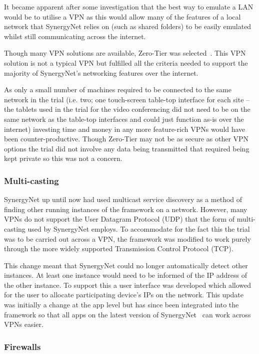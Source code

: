 \documentclass[a4paper,11pt]{article}
\begin{document}
It became apparent after some investigation that the best way to emulate a LAN would be to utilise a VPN as this would allow many of the features of a local network that SynergyNet relies on (such as shared folders) to be easily emulated whilst still communicating across the internet.

Though many VPN solutions are available, Zero-Tier was selected~\cite{zerotier:2016}.
This VPN solution is not a typical VPN but fulfilled all the criteria needed to support the majority of SynergyNet’s networking features over the internet.

As only a small number of machines required to be connected to the same network in the trial (i.e. two; one touch-screen table-top interface for each site – the tablets used in the trial for the video conferencing did not need to be on the same network as the table-top interfaces and could just function as-is over the internet) investing time and money in any more feature-rich VPNs would have been counter-productive.
Though Zero-Tier may not be as secure as other VPN options the trial did not involve any data being transmitted that required being kept private so this was not a concern.

\subsubsection{Multi-casting}

SynergyNet up until now had used multicast service discovery as a method of finding other running instances of the framework on a network.
However, many VPNs do not support the User Datagram Protocol (UDP) that the form of multi-casting used by SynergyNet employs.
To accommodate for the fact this the trial was to be carried out across a VPN, the framework was modified to work purely through the more widely supported Transmission Control Protocol (TCP).

This change meant that SynergyNet could no longer automatically detect other instances.
At least one instance would need to be informed of the IP address of the other instance.
To support this a user interface was developed which allowed for the user to allocate participating device's IPs on the network.
This update was initially a change at the app level but has since been integrated into the framework so that all apps on the latest version of SynergyNet~\cite{hatch:2011} can work across VPNs easier.

\subsubsection{Firewalls}
\end{document}
